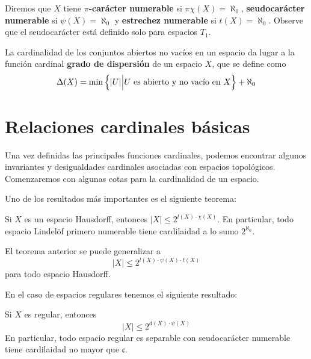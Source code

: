 \documentclass[12pt]{report}
\theoremstyle{largebreak}
\newcommand\abs[1]{\ensuremath{\lvert#1\rvert}}
\begin{document}
    \begin{mydef}
        Diremos que $X$ tiene \textbf{$\pi$-carácter numerable} si $\pi\chi(X)=\aleph_0$, \textbf{seudocarácter numerable} si $\psi(X)=\aleph_0$ y \textbf{estrechez numerable} si $t(X)=\aleph_0$. Observe que el seudocarácter está definido solo para espacios $T_1$.
    \end{mydef}
    
    La cardinalidad de los conjuntos abiertos no vacíos en un espacio da lugar a la función cardinal \textbf{grado de dispersión} de un espacio $X$, que se define como
    \begin{equation*}
        \Delta(X)=\min\left\{\abs{U}\Big|U\textup{ es abierto y no vacío en }X \right\}+\aleph_0
    \end{equation*}

    \section{Relaciones cardinales básicas}

    Una vez definidas las principales funciones cardinales, podemos encontrar algunos invariantes y desigualdades cardinales asociadas con espacios topológicos. Comenzaremos con algunas cotas para la cardinalidad de un espacio.
    
    Uno de los resultados más importantes es el siguiente teorema:

    \begin{theor}
        Si $X$ es un espacio Hausdorff, entonces $\abs{X}\leq 2^{l(X)\cdot\chi(X)}$. En particular, todo espacio Lindelöf primero numerable tiene cardilaidad a lo sumo $2^{\aleph_0}$.
    \end{theor}

    El teorema anterior se puede generalizar a
    \begin{equation*}
        \abs{X}\leq 2^{ l(X)\cdot\psi(X)\cdot t(X)}
    \end{equation*}
    para todo espacio Hausdorff.

    En el caso de espacios regulares tenemos el siguiente resultado:

    \begin{theor}
        Si $X$ es regular, entonces
        \begin{equation*}
            \abs{X}\leq 2^{d(X)\cdot\psi(X)}
        \end{equation*}
        En particular, todo espacio regular es separable con seudocarácter numerable tiene cardilaidad no mayor que $\mathfrak{c}$.
    \end{theor}
\end{document}
